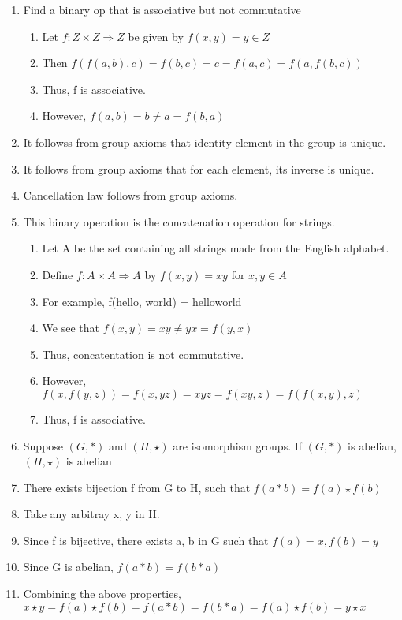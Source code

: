 \documentclass{article}
\begin{document}
\begin{enumerate}
\item Find a binary op that is associative but not commutative
\begin{enumerate}
\item Let $ f: Z \times Z \Rightarrow Z $ be given by  $ f(x, y) = y \in Z $
\item Then $ f(f(a, b), c) = f(b, c) = c = f(a, c) = f(a, f(b, c)) $
\item Thus, f is associative.
\item However, $ f(a, b) = b \neq a = f(b, a) $

\end{enumerate}

\item It followss from group axioms that identity element in the group is
unique.
\item It follows from group axioms that for each element, its inverse is unique.
\item Cancellation law follows from group axioms.

\item This binary operation is the concatenation operation for strings.
\begin{enumerate}
\item Let A be the set containing all strings made from the English alphabet.

\item Define $ f: A \times A \Rightarrow A $ by $ f(x, y) = xy $ for $ x, y \in A $

\item For example, f(hello, world) = helloworld
\item We see that $ f(x, y) = xy \neq yx = f(y, x) $
\item Thus, concatentation is not commutative.

\item However, $f(x, f(y, z)) = f(x, yz) = xyz = f(xy, z) = f(f(x, y), z) $

\item Thus, f is associative.

\end{enumerate}

\item Suppose $(G, \ast) $ and $(H, \star)$ are isomorphism groups. If $(G, \ast)$ is abelian, $(H, \star) $ is abelian

\item There exists bijection f from G to H, such that $ f(a \ast b) = f(a)\star f(b) $
\item Take any arbitray x, y in H.
\item Since f is bijective, there exists a, b in G such that $ f(a) = x, f(b) = y $
\item Since G is abelian, $ f(a \ast b) = f(b \ast a) $
\item Combining the above properties, $ x \star y = f(a) \star f(b) = f(a \ast b) = f(b \ast a) = f(a) \star f(b) = y \star x $


\end{enumerate}
\end{document}

